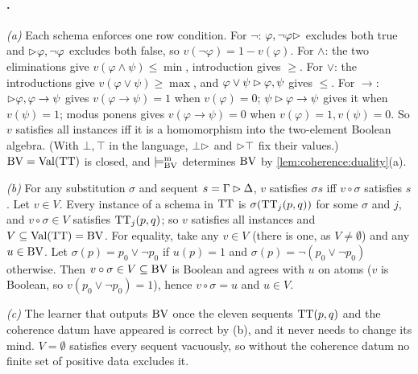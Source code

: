 \paragraph{.} \emph{(a)} Each schema enforces one row condition. For $\neg$: $\varphi,\neg\varphi\rhd$ excludes both true and $\rhd\varphi,\neg\varphi$ excludes both false, so $v(\neg\varphi)=1-v(\varphi)$. For $\wedge$: the two eliminations give $v(\varphi\wedge\psi)\le\min$, introduction gives $\ge$. For $\vee$: the introductions give $v(\varphi\vee\psi)\ge\max$, and $\varphi\vee\psi\rhd\varphi,\psi$ gives $\le$. For $\to$: $\rhd\varphi,\varphi\to\psi$ gives $v(\varphi\to\psi)=1$ when $v(\varphi)=0$; $\psi\rhd\varphi\to\psi$ gives it when $v(\psi)=1$; modus ponens gives $v(\varphi\to\psi)=0$ when $v(\varphi)=1,v(\psi)=0$. So $v$ satisfies all instances iff it is a homomorphism into the two-element Boolean algebra. (With $\bot,\top$ in the language, $\bot\rhd$ and $\rhd\top$ fix their values.) $\mathrm{BV}=\mathrm{Val}(\mathrm{TT})$ is closed, and $\models^{\mathrm m}_{\mathrm{BV}}$ determines $\mathrm{BV}$ by \cref{lem:coherence:duality}(a).

\emph{(b)} For any substitution $\sigma$ and sequent $s=\Gamma\rhd\Delta$, $v$ satisfies $\sigma s$ iff $v\circ\sigma$ satisfies $s$. Let $v\in V$. Every instance of a schema in $\mathrm{TT}$ is $\sigma(\mathrm{TT}_j(p,q))$ for some $\sigma$ and $j$, and $v\circ\sigma\in V$ satisfies $\mathrm{TT}_j(p,q)$; so $v$ satisfies all instances and $V\subseteq\mathrm{Val}(\mathrm{TT})=\mathrm{BV}$. For equality, take any $v\in V$ (there is one, as $V\neq\emptyset$) and any $u\in\mathrm{BV}$. Let $\sigma(p)=p_0\vee\neg p_0$ if $u(p)=1$ and $\sigma(p)=\neg(p_0\vee\neg p_0)$ otherwise. Then $v\circ\sigma\in V\subseteq\mathrm{BV}$ is Boolean and agrees with $u$ on atoms ($v$ is Boolean, so $v(p_0\vee\neg p_0)=1$), hence $v\circ\sigma=u$ and $u\in V$.

\emph{(c)} The learner that outputs $\mathrm{BV}$ once the eleven sequents $\mathrm{TT}(p,q)$ and the coherence datum have appeared is correct by (b), and it never needs to change its mind. $V=\emptyset$ satisfies every sequent vacuously, so without the coherence datum no finite set of positive data excludes it.


